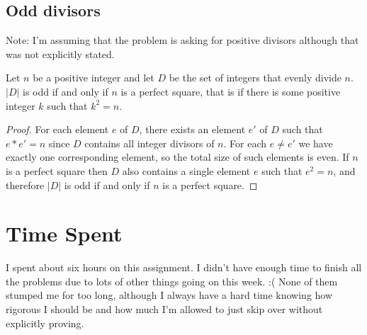 \documentclass[12pt]{article}
\begin{document}
\subsection*{Odd divisors}


Note: I'm assuming that the problem is asking for positive divisors although that was not explicitly stated.


Let $n$ be a positive integer and let $D$ be the set of integers that evenly divide $n$. $|D|$ is odd if and only if $n$ is a perfect square, that is if there is some positive integer $k$ such that $k^2 = n$.
\begin{proof}
For each element $e$ of $D$, there exists an element $e'$ of $D$ such that $e*e' = n$ since $D$ contains all integer divisors of $n$. For each $e \neq e'$ we have exactly one corresponding element, so the total size of such elements is even. If $n$ is a perfect square then $D$ also contains a single element $e$ such that $e^2=n$, and therefore $|D|$ is odd if and only if $n$ is a perfect square.
\end{proof}
\section{Time Spent}

I spent about six hours on this assignment. I didn't have enough time to finish all the problems due to lots of other things going on this week. :( None of them stumped me for too long, although I always have a hard time knowing how rigorous I should be and how much I'm allowed to just skip over without explicitly proving.
\end{document}
